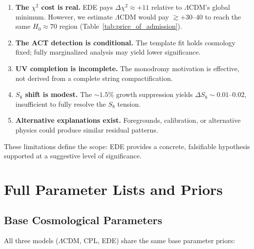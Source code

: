 \documentclass[a4paper,11pt]{article}
\begin{document}
\begin{enumerate}
    \item \textbf{The $\chi^2$ cost is real.} EDE pays $\Delta\chi^2 \approx +11$ relative to $\Lambda$CDM's global minimum. However, we estimate $\Lambda$CDM would pay $\gtrsim +30$--$40$ to reach the same $H_0 \approx 70$ region (Table~\ref{tab:price_of_admission}).
    
    \item \textbf{The ACT detection is conditional.} The template fit holds cosmology fixed; fully marginalized analysis may yield lower significance.
    
    \item \textbf{UV completion is incomplete.} The monodromy motivation is effective, not derived from a complete string compactification.
    
    \item \textbf{$S_8$ shift is modest.} The $\sim 1.5\%$ growth suppression yields $\Delta S_8 \sim 0.01$--$0.02$, insufficient to fully resolve the $S_8$ tension.
    
    \item \textbf{Alternative explanations exist.} Foregrounds, calibration, or alternative physics could produce similar residual patterns.
\end{enumerate}

These limitations define the scope: EDE provides a concrete, falsifiable hypothesis supported at a suggestive level of significance.



\appendix

\section{Full Parameter Lists and Priors}
\label{app:priors}

\subsection{Base Cosmological Parameters}

All three models ($\Lambda$CDM, CPL, EDE) share the same base parameter priors:
\end{document}
